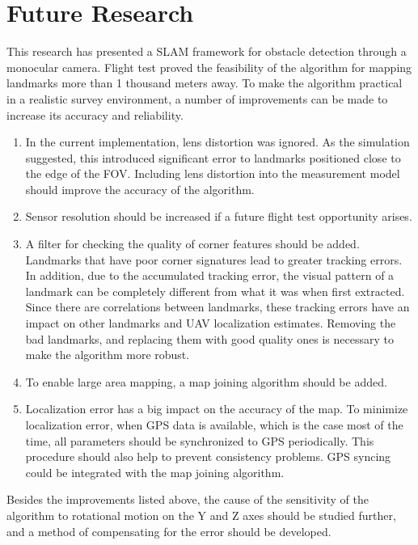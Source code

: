 \section{Future Research}
This research has presented a SLAM framework for obstacle detection
through a monocular camera. Flight test proved the feasibility of the
algorithm for mapping landmarks more than 1 thousand meters away.
To make the algorithm practical in a realistic survey environment, a number
of improvements can be made to increase its accuracy and reliability.
\begin{enumerate}
  \item In the current implementation, lens distortion was ignored. As
  the simulation suggested, this introduced significant error to
  landmarks positioned close to the edge of the FOV. Including lens
  distortion into the measurement model should improve the accuracy of
  the algorithm.
  \item Sensor resolution should be increased if a future flight
  test opportunity arises.
  \item A filter for checking the quality of corner features should be
  added. Landmarks that have poor corner signatures lead to greater
  tracking errors. In addition, due to the accumulated tracking error,
  the visual pattern of a landmark can be completely different from
  what it was when first extracted. Since there are correlations between
  landmarks, these tracking errors have an impact on other landmarks and
  UAV localization estimates. Removing the bad landmarks, and
  replacing them with good quality ones is necessary to make the
  algorithm more robust.
  \item To enable large area mapping, a map joining algorithm should
  be added.
  \item Localization error has a big impact on the accuracy of the
  map. To minimize localization error, when GPS data is available,
  which is the case most of the time, all parameters should be
  synchronized to GPS periodically. This procedure should also help to
  prevent consistency problems. GPS syncing could be integrated with
  the map joining algorithm.
\end{enumerate}

Besides the improvements listed above, the cause of the sensitivity of
the algorithm to rotational motion on the Y and Z axes should be
studied further, and a method of compensating for the error should be
developed.

